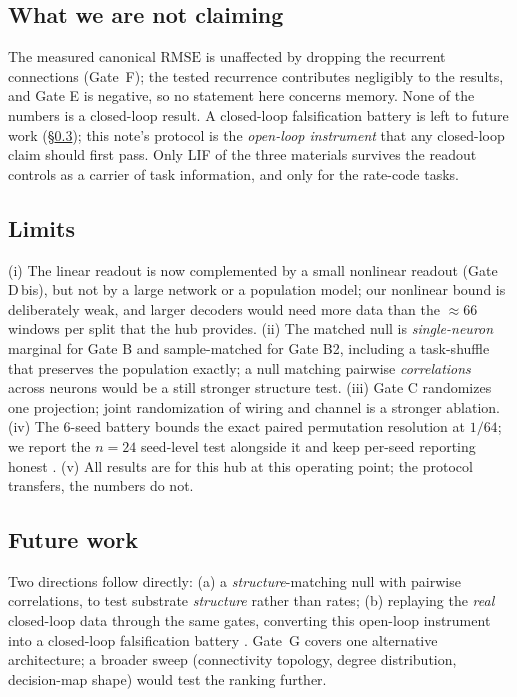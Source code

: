 \documentclass[10pt,a4paper]{article}
\newcommand{\RMSE}{\ensuremath{\mathrm{RMSE}}}
\begin{document}
\subsection{What we are not claiming}\label{sec:disc3}

The measured canonical $\RMSE$ is unaffected by dropping the recurrent
connections (Gate~F); the tested recurrence contributes negligibly to
the results, and Gate E is negative, so no statement here concerns
memory. None of the numbers is a closed-loop result. A closed-loop
falsification battery is left to future work (\S\ref{sec:disc5}); this
note's protocol is the \emph{open-loop instrument} that any closed-loop
claim should first pass. Only LIF of the three materials survives the
readout controls as a carrier of task information, and only for the
rate-code tasks.

\subsection{Limits}\label{sec:disc4}

(i) The linear readout is now complemented by a small nonlinear readout
(Gate D\,bis), but not by a large network or a population model; our
nonlinear bound is deliberately weak, and larger decoders would need
more data than the $\approx66$ windows per split that the hub provides.
(ii) The matched null is \emph{single-neuron} marginal for Gate B and
sample-matched for Gate B2, including a task-shuffle that preserves the
population exactly; a null matching pairwise \emph{correlations}
across neurons would be a still stronger structure test.
(iii) Gate C randomizes one projection; joint randomization of wiring
and channel is a stronger ablation. (iv) The $6$-seed battery bounds the
exact paired permutation resolution at $1/64$; we report the $n=24$
seed-level test alongside it and keep per-seed reporting honest
\cite{hurlbert1984}. (v) All results are for this hub at this operating
point; the protocol transfers, the numbers do not.

\subsection{Future work}\label{sec:disc5}

Two directions follow directly: (a) a \emph{structure}-matching null
with pairwise correlations, to test substrate \emph{structure} rather
than rates; (b) replaying the \emph{real} closed-loop data through the
same gates, converting this open-loop instrument into a closed-loop
falsification battery \cite{carmena2003,embodied_neurocomp}. Gate~G
covers one alternative architecture; a broader sweep (connectivity
topology, degree distribution, decision-map shape) would test the
ranking further.
\end{document}
